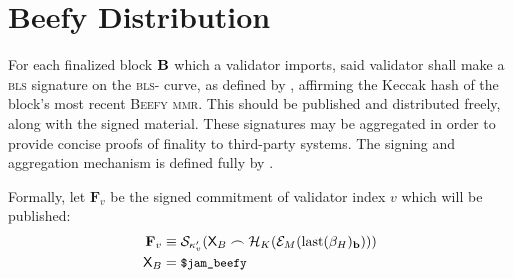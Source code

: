 \section{Beefy Distribution}\label{sec:beefy}

For each finalized block $\mathbf{B}$ which a validator imports, said validator shall make a \textsc{bls} signature on the \textsc{bls}- curve, as defined by \cite{bls12-381}, affirming the Keccak hash of the block's most recent \textsc{Beefy} \textsc{mmr}. This should be published and distributed freely, along with the signed material. These signatures may be aggregated in order to provide concise proofs of finality to third-party systems. The signing and aggregation mechanism is defined fully by \cite{cryptoeprint:2022/1611}.

Formally, let $\mathbf{F}_v$ be the signed commitment of validator index $v$ which will be published:
\begin{align}\label{eq:beefysignedcommitment}
  \mathbf{F}_v &\equiv \signdata_{\activeset'_v}(\mathsf{X}_B\concat\keccak(\Fmmrencode{\text{last}(\recenthistory)_\mathbf{b}}))\\
  \mathsf{X}_B &= \token{\$jam\_beefy}
\end{align}
